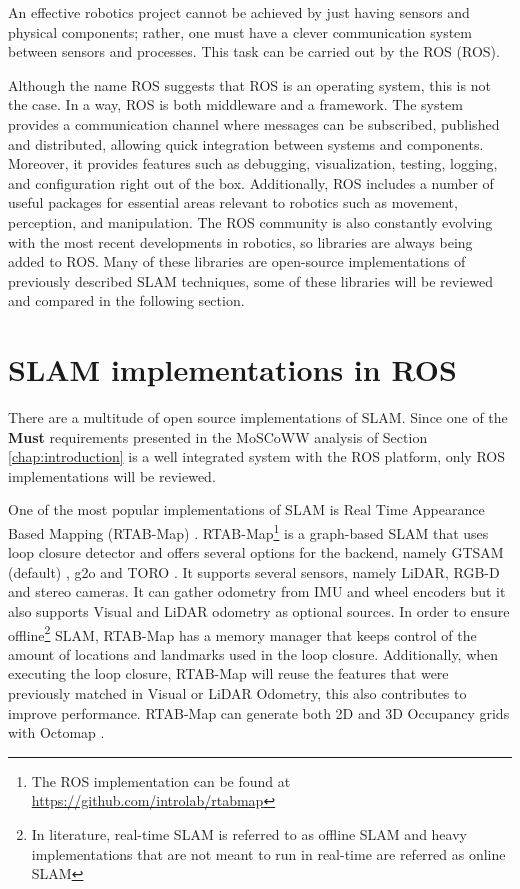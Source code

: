 An effective robotics project cannot be achieved by just having sensors and physical components; rather, one must have a clever communication system between sensors and processes. This task can be carried out by the \acl*{ROS} (\acs*{ROS}). 

Although the name \acl*{ROS} suggests that \acs*{ROS} is an operating system, this is not the case.  In a way, \acs*{ROS} is both middleware and a framework. The system provides a communication channel where messages can be subscribed, published and distributed, allowing quick integration between systems and components. Moreover, it provides features such as debugging, visualization, testing, logging, and configuration right out of the box. Additionally, ROS includes a number of useful packages for essential areas relevant to robotics such as movement, perception, and manipulation. The ROS community is also constantly evolving with the most recent developments in robotics, so libraries are always being added to ROS. Many of these libraries are open-source implementations of previously described \acs*{SLAM} techniques, some of these libraries will be reviewed and compared in the following section.


\section{\acs*{SLAM} implementations in \acs*{ROS}}

There are a multitude of open source implementations of \acs*{SLAM}. Since one of the \textbf{Must} requirements presented in the MoSCoWW analysis of Section \ref*{chap:introduction} is a well integrated system with the \acs*{ROS} platform, only \acs*{ROS} implementations will be reviewed. 

One of the most popular implementations of \acs*{SLAM} is Real Time Appearance Based Mapping (RTAB-Map) \cite{labbe_rtab-map_2019}. RTAB-Map\footnote{The \acs*{ROS} implementation can be found at \url{https://github.com/introlab/rtabmap}} is a graph-based \acs*{SLAM} that uses loop closure detector and offers several options for the backend, namely GTSAM (default) \cite{gtsam}, g2o \cite{kummerle_g2o_2011} and TORO \cite{grisetti_nonlinear_2009}. It supports several sensors, namely \acs*{LiDAR}, RGB-D and stereo cameras. It can gather odometry from \acs*{IMU} and wheel encoders but it also supports Visual and \acs*{LiDAR} odometry as optional sources. In order to ensure offline\footnote{In literature, real-time \acs*{SLAM} is referred to as offline \acs*{SLAM} and heavy implementations that are not meant to run in real-time are referred as online \acs*{SLAM}} \acs*{SLAM}, RTAB-Map has a memory manager that keeps control of the amount of locations and landmarks used in the loop closure. Additionally, when executing the loop closure, RTAB-Map will reuse the features that were previously matched in Visual or \acs*{LiDAR} Odometry, this also contributes to improve performance. RTAB-Map can generate both 2D and 3D Occupancy grids with Octomap \cite{hornung_octomap_2013}.

